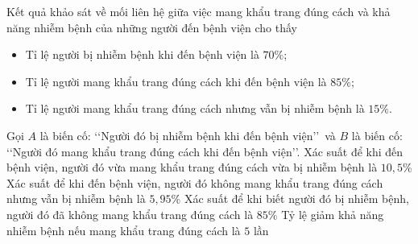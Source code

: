 \begin{ex}%

Kết quả khảo sát về mối liên hệ giữa việc mang khẩu trang đúng cách và khả năng nhiễm bệnh của những người đến bệnh viện cho thấy
	\begin{itemize}
		\item Tỉ lệ người bị nhiễm bệnh khi đến bệnh viện là $70\%$;
		\item Tỉ lệ người mang khẩu trang đúng cách khi đến bệnh viện là $85\%$;
		\item Tỉ lệ người mang khẩu trang đúng cách nhưng vẫn bị nhiễm bệnh là $15\%$.
	\end{itemize}
Gọi $A$ là biến cố: \lq\lq Người đó bị nhiễm bệnh khi đến bệnh viện\rq\rq\, và $B$ là biến cố: \lq\lq Người đó mang khẩu trang đúng cách khi đến bệnh viện\rq\rq.
	\choiceTF
	{\True Xác suất để khi đến bệnh viện, người đó vừa mang khẩu trang đúng cách vừa bị nhiễm bệnh là $10{,}5\%$}
	{Xác suất để khi đến bệnh viện, người đó không mang khẩu trang đúng cách nhưng vẫn bị nhiễm bệnh là $5{,}95\%$}
	{\True Xác suất để khi biết người đó bị nhiễm bệnh, người đó đã không mang khẩu trang đúng cách là $85\%$}
	{Tỷ lệ giảm khả năng nhiễm bệnh nếu mang khẩu trang đúng cách là $5$ lần}
\end{ex}
